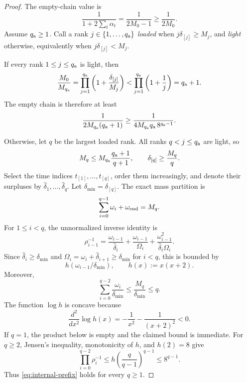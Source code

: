 \documentclass[11pt]{article}
\theoremstyle{definition}
\theoremstyle{remark}
\newcommand{\rankmass}{M}
\begin{document}
\begin{proof}
The empty-chain value is
\[
 \frac{1}{1+2\sum_t \alpha_t}
 =\frac1{2\rankmass_0-1}\ge\frac1{2\rankmass_0}.
\]
Assume \(q_{\rm a}\ge1\).  Call a rank
\(j\in\{1,\ldots,q_{\rm a}\}\) \emph{loaded} when
\(j\delta_{[j]}\ge\rankmass_j\), and \emph{light} otherwise, equivalently
when \(j\delta_{[j]}<\rankmass_j\).

If every rank \(1\le j\le q_{\rm a}\) is light, then
\[
 \frac{\rankmass_0}{\rankmass_{q_{\rm a}}}
 =\prod_{j=1}^{q_{\rm a}}
   \left(1+\frac{\delta_{[j]}}{\rankmass_j}\right)
 <\prod_{j=1}^{q_{\rm a}}\left(1+\frac1j\right)
 =q_{\rm a}+1.
\]
The empty chain is therefore at least
\[
 \frac1{2\rankmass_{q_{\rm a}}(q_{\rm a}+1)}
 \ge\frac1{4\rankmass_{q_{\rm a}}q_{\rm a}\,8^{q_{\rm a}-1}}.
\]

Otherwise, let \(q\) be the largest loaded rank.  All ranks
\(q<j\le q_{\rm a}\) are light, so
\begin{equation}
 \rankmass_q
 \le\rankmass_{q_{\rm a}}\frac{q_{\rm a}+1}{q+1},
 \qquad
 \delta_{[q]}\ge\frac{\rankmass_q}{q}.
 \label{eq:dense-consequences}
\end{equation}
Select the time indices \(t_{[1]},\ldots,t_{[q]}\), order them increasingly,
and denote their surpluses by
\(\widehat\delta_1,\ldots,\widehat\delta_q\).  Let
\(\delta_{\min}=\delta_{[q]}\).  The exact mass partition is
\[
 \sum_{i=0}^{q-1}\omega_i+\omega_{\rm end}=\rankmass_q.
\]
For \(1\le i<q\), the unnormalized inverse identity is
\begin{equation}
 \rho_{i-1}^{-1}
 =\frac{\omega_{i-1}}{\widehat\delta_i}
  +\frac{\omega_{i-1}}{\Omega_i}
  +\frac{\omega_{i-1}^2}{\widehat\delta_i\Omega_i}.
 \label{eq:unnormalized-inverse}
\end{equation}
Since \(\widehat\delta_i\ge\delta_{\min}\) and
\(\Omega_i=\omega_i+\widehat\delta_{i+1}\ge\delta_{\min}\) for
\(i<q\), this is bounded by
\[
 h(\omega_{i-1}/\delta_{\min}),
 \qquad
 h(x):=x(x+2).
\]
Moreover,
\[
 \sum_{i=0}^{q-2}\frac{\omega_i}{\delta_{\min}}
 \le\frac{\rankmass_q}{\delta_{\min}}\le q.
\]
The function \(\log h\) is concave because
\[
 \frac{d^2}{dx^2}\log h(x)
 =-\frac1{x^2}-\frac1{(x+2)^2}<0.
\]
If \(q=1\), the product below is empty and the claimed bound is immediate.
For \(q\ge2\), Jensen's inequality, monotonicity of \(h\), and
\(h(2)=8\) give
\begin{equation}
 \prod_{i=0}^{q-2}\rho_i^{-1}
 \le
 h\left(\frac q{q-1}\right)^{q-1}
 \le8^{q-1}.
 \label{eq:internal-prefix}
\end{equation}
Thus \eqref{eq:internal-prefix} holds for every \(q\ge1\).


\end{proof}
\end{document}
